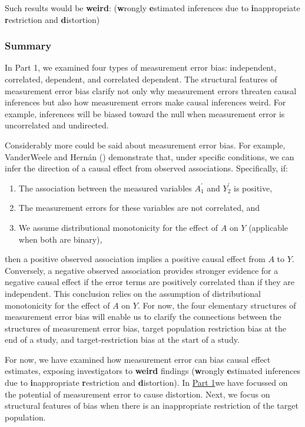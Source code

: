 \documentclass[
  single column]{article}
\providecommand{\tightlist}{%
  \setlength{\itemsep}{0pt}\setlength{\parskip}{0pt}}\usepackage{longtable,booktabs,array}
\begin{document}
Such results would be \textbf{weird}: (\textbf{w}rongly
\textbf{e}stimated inferences due to \textbf{i}nappropriate
\textbf{r}estriction and \textbf{d}istortion)

\subsubsection{Summary}\label{summary}

In Part 1, we examined four types of measurement error bias:
independent, correlated, dependent, and correlated dependent. The
structural features of measurement error bias clarify not only why
measurement errors threaten causal inferences but also how measurement
errors make causal inferences weird. For example, inferences will be
biased toward the null when measurement error is uncorrelated and
undirected.

Considerably more could be said about measurement error bias. For
example, VanderWeele and Hernán ()
demonstrate that, under specific conditions, we can infer the direction
of a causal effect from observed associations. Specifically, if:

\begin{enumerate}
\def\labelenumi{\arabic{enumi}.}
\tightlist
\item
  The association between the measured variables \(A^{\prime}_{1}\) and
  \(Y^{\prime}_{2}\) is positive,
\item
  The measurement errors for these variables are not correlated, and
\item
  We assume distributional monotonicity for the effect of \(A\) on \(Y\)
  (applicable when both are binary),
\end{enumerate}

then a positive observed association implies a positive causal effect
from \(A\) to \(Y\). Conversely, a negative observed association
provides stronger evidence for a negative causal effect if the error
terms are positively correlated than if they are independent. This
conclusion relies on the assumption of distributional monotonicity for
the effect of \(A\) on \(Y\). For now, the four elementary structures of
measurement error bias will enable us to clarify the connections between
the structures of measurement error bias, target population restriction
bias at the end of a study, and target-restriction bias at the start of
a study.

For now, we have examined how measurement error can bias causal effect
estimates, exposing investigators to \textbf{weird} findings
(\textbf{w}rongly \textbf{e}stimated inferences due to
\textbf{i}nappropriate \textbf{r}estriction and \textbf{d}istortion). In
\hyperref[id-sec-1]{Part 1}we have focussed on the potential of
measurement error to cause distortion. Next, we focus on structural
features of bias when there is an inappropriate restriction of the
target population.
\end{document}
